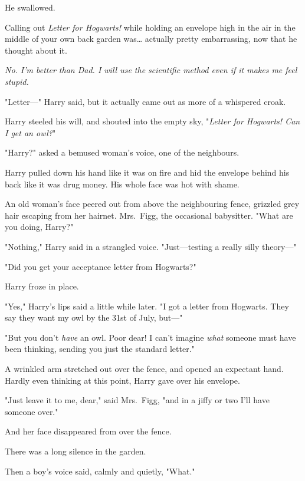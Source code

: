 He swallowed.

Calling out \emph{Letter for Hogwarts!} while holding an envelope high in the
air in the middle of your own back garden was{\ldots} actually pretty
embarrassing, now that he thought about it.

\emph{No. I'm better than Dad. I will use the scientific method even if it
makes me feel stupid.}

"Letter---" Harry said, but it actually came out as more of a whispered croak.

Harry steeled his will, and shouted into the empty sky, "\emph{Letter for
Hogwarts! Can I get an owl?}"

"Harry?" asked a bemused woman's voice, one of the neighbours.

Harry pulled down his hand like it was on fire and hid the envelope behind his
back like it was drug money. His whole face was hot with shame.

An old woman's face peered out from above the neighbouring fence, grizzled grey
hair escaping from her hairnet. Mrs.~Figg, the occasional babysitter. "What are
you doing, Harry?"

"Nothing," Harry said in a strangled voice. "Just---testing a really silly
theory---"

"Did you get your acceptance letter from Hogwarts?"

Harry froze in place.

"Yes," Harry's lips said a little while later. "I got a letter from Hogwarts.
They say they want my owl by the 31st of July, but---"

"But you don't \emph{have} an owl. Poor dear! I can't imagine \emph{what}
someone must have been thinking, sending you just the standard letter."

A wrinkled arm stretched out over the fence, and opened an expectant hand.
Hardly even thinking at this point, Harry gave over his envelope.

"Just leave it to me, dear," said Mrs.~Figg, "and in a jiffy or two I'll have
someone over."

And her face disappeared from over the fence.

There was a long silence in the garden.

Then a boy's voice said, calmly and quietly, "What."
